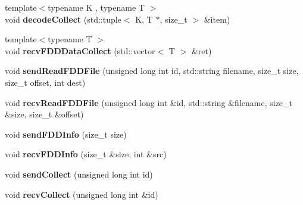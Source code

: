 \begin{DoxyCompactItemize}
\item 
\hypertarget{classfaster_1_1fastComm_a3a5241970fed0e747bdbcdd3a78981d5}{}{\footnotesize template$<$typename K , typename T $>$ }\\void {\bfseries decode\+Collect} (std\+::tuple$<$ K, T $\ast$, size\+\_\+t $>$ \&item)\label{classfaster_1_1fastComm_a3a5241970fed0e747bdbcdd3a78981d5}

\item 
\hypertarget{classfaster_1_1fastComm_a99d64fc5917eb51878e48aa0b16e7cf2}{}{\footnotesize template$<$typename T $>$ }\\void {\bfseries recv\+F\+D\+D\+Data\+Collect} (std\+::vector$<$ T $>$ \&ret)\label{classfaster_1_1fastComm_a99d64fc5917eb51878e48aa0b16e7cf2}

\item 
\hypertarget{classfaster_1_1fastComm_a1235a0aea1570313416b46b5f73ca2c0}{}void {\bfseries send\+Read\+F\+D\+D\+File} (unsigned long int id, std\+::string filename, size\+\_\+t size, size\+\_\+t offset, int dest)\label{classfaster_1_1fastComm_a1235a0aea1570313416b46b5f73ca2c0}

\item 
\hypertarget{classfaster_1_1fastComm_aa6a698ffe5a0f0d37e6b3fb7b8c5d3c4}{}void {\bfseries recv\+Read\+F\+D\+D\+File} (unsigned long int \&id, std\+::string \&filename, size\+\_\+t \&size, size\+\_\+t \&offset)\label{classfaster_1_1fastComm_aa6a698ffe5a0f0d37e6b3fb7b8c5d3c4}

\item 
\hypertarget{classfaster_1_1fastComm_a512e3c2324c15ba73df64f4607e0b064}{}void {\bfseries send\+F\+D\+D\+Info} (size\+\_\+t size)\label{classfaster_1_1fastComm_a512e3c2324c15ba73df64f4607e0b064}

\item 
\hypertarget{classfaster_1_1fastComm_aff3221fe657da542999b25ab17b7bc1b}{}void {\bfseries recv\+F\+D\+D\+Info} (size\+\_\+t \&size, int \&src)\label{classfaster_1_1fastComm_aff3221fe657da542999b25ab17b7bc1b}

\item 
\hypertarget{classfaster_1_1fastComm_a3cf9ee0da2560c2c14b4082defd43918}{}void {\bfseries send\+Collect} (unsigned long int id)\label{classfaster_1_1fastComm_a3cf9ee0da2560c2c14b4082defd43918}

\item 
\hypertarget{classfaster_1_1fastComm_abe93aedc98fe9f135befcba281d9255d}{}void {\bfseries recv\+Collect} (unsigned long int \&id)\label{classfaster_1_1fastComm_abe93aedc98fe9f135befcba281d9255d}


\end{DoxyCompactItemize}
